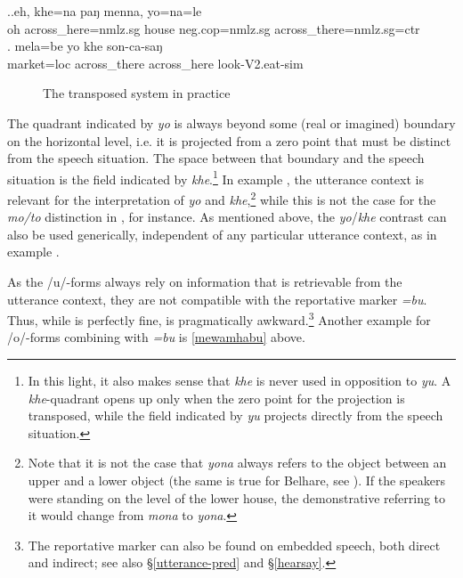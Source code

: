 \ex.\ag.\label{khenamenna}eh, khe=na paŋ menna, yo=na=le\\
oh across\_here{\sc =nmlz.sg} house {\sc neg.cop=nmlz.sg} across\_there{\sc =nmlz.sg=ctr}\\
 \bg. mela=be      yo   khe    son-ca-saŋ\\
market{\sc =loc} across\_there across\_here look{\sc -V2.eat-sim} \\
 
 
\begin{figure}
\centering
\setlength{\fboxsep}{0pt}
\caption{The transposed system in practice}\label{deixill-3}
\end{figure}

The quadrant indicated by \emph{yo} is always beyond some (real or imagined) boundary on the horizontal level, i.e. it is projected from a zero point that must be distinct from the speech situation. The space between that boundary and the speech situation is the field indicated by \emph{khe}.\footnote{In this light, it also makes sense that \emph{khe} is never used in opposition to \emph{yu}. A \emph{khe}-quadrant opens up only when the zero point for the projection is transposed, while the field indicated by \emph{yu} projects directly from the speech situation.} In  example \Last[a], the  utterance context is relevant for the interpretation of \emph{yo} and \emph{khe},\footnote{Note that it is not the case that \emph{yona} always refers to the object between an upper and a lower object (the same is true for Belhare, see \citet{Bickel2001Deictic}).  If the speakers were standing on the level of the lower house, the demonstrative referring to it would change from \emph{mona} to \emph{yona}.} while this is not the case for the \emph{mo/to} distinction in \LLast[b], for instance. As mentioned above, the \emph{yo}/\emph{khe}  contrast can also be used generically, independent  of any particular utterance context, as in example  \Last[b].
 
As the /u/-forms always rely on information that is retrievable from the utterance context, they are not compatible with the reportative marker \emph{=bu}. Thus, while \Next[a] is perfectly fine, \Next[b] is pragmatically awkward.\footnote{The reportative marker can also be found on embedded speech, both direct and indirect; see also §\ref{utterance-pred} and §\ref{hearsay}.} Another example for /o/-forms combining with \emph{=bu} is \ref{mewamhabu} above.

